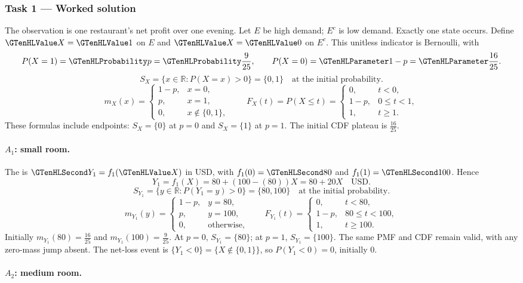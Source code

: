\subsubsection*{Task 1 --- Worked solution}\label{sol:c3-restaurant-model}
The observation is one restaurant's net profit over one evening. Let $E$ be high demand; $E^c$ is low demand. Exactly one state occurs. Define $\Indicator{X}=\Indicator{1}$ on $E$ and $\Indicator{X}=\Indicator{0}$ on $E^c$. This unitless indicator is Bernoulli, with
\[P(X=1)=\SuccessProb{p}=\SuccessProb{\frac{9}{25}},\qquad P(X=0)=\FailureProb{1-p}=\FailureProb{\frac{16}{25}}.\]
\[S_X=\{x\in\mathbb R:P(X=x)>0\}=\{0,1\}\quad\text{at the initial probability}.\]
\[m_X(x)=\begin{cases}1-p,&x=0,\\p,&x=1,\\0,&x\notin\{0,1\},\end{cases}\qquad F_X(t)=P(X\leq t)=\begin{cases}0,&t<0,\\1-p,&0\leq t<1,\\1,&t\geq1.\end{cases}\]
These formulas include endpoints: $S_X=\{0\}$ at $p=0$ and $S_X=\{1\}$ at $p=1$. The initial CDF plateau is $\frac{16}{25}$.
\paragraph{$A_1$: small room.}
The  is $\Money{Y_1}=f_1(\Indicator{X})$ in USD, with $f_1(0)=\Money{80}$ and $f_1(1)=\Money{100}$. Hence
\[Y_1=f_1(X)=80+(100-(80))X=80+20X\quad\text{USD}.\]
\[S_{Y_1}=\{y\in\mathbb R:P(Y_1=y)>0\}=\{80,100\}\quad\text{at the initial probability}.\]
\[m_{Y_1}(y)=\begin{cases}1-p,&y=80,\\p,&y=100,\\0,&\text{otherwise},\end{cases}\qquad F_{Y_1}(t)=\begin{cases}0,&t<80,\\1-p,&80\leq t<100,\\1,&t\geq 100.\end{cases}\]
Initially $m_{Y_1}(80)=\frac{16}{25}$ and $m_{Y_1}(100)=\frac{9}{25}$. At $p=0$, $S_{Y_1}=\{80\}$; at $p=1$, $S_{Y_1}=\{100\}$. The same PMF and CDF remain valid, with any zero-mass jump absent.
The net-loss event is $\{Y_1<0\}=\{X\notin\{0,1\}\}$, so $P(Y_1<0)=0$, initially $0$.
\paragraph{$A_2$: medium room.}
